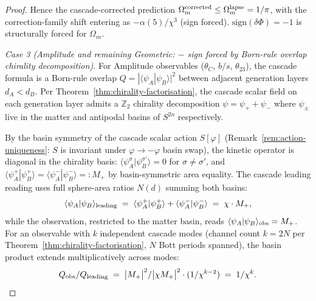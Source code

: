 \documentclass[12pt,a4paper]{article}
\begin{document}
\begin{proof}
Hence the cascade-corrected prediction
$\Omega_m^{\rm corrected}\leq \Omega_m^{\rm lapse}=1/\pi$, with the
correction-family shift entering as $-\alpha(5)/\chi^3$ (sign forced).
$\mathrm{sign}(\delta\Phi)=-1$ is structurally forced for $\Omega_m$.

\emph{Case 3 (Amplitude and remaining Geometric: $-$ sign forced by
Born-rule overlap chirality decomposition).}
For Amplitude observables ($\theta_C$, $b/s$, $\theta_{23}$), the
cascade formula is a Born-rule overlap
$Q = |\langle\psi_A | \psi_B\rangle|^2$ between adjacent generation
layers $d_A < d_B$. Per Theorem~\ref{thm:chirality-factorisation},
the cascade scalar field on each generation layer admits a $\mathbb{Z}_2$
chirality decomposition $\psi = \psi_+ + \psi_-$ where $\psi_\pm$
live in the matter and antipodal basins of $S^{2n}$ respectively.

By the basin symmetry of the cascade scalar action $S[\varphi]$
(Remark~\ref{rem:action-uniqueness}: $S$ is invariant under
$\varphi\to-\varphi$ basin swap), the kinetic operator is diagonal in
the chirality basis: $\langle\psi_A^\sigma | \psi_B^{\sigma'}\rangle = 0$
for $\sigma\neq\sigma'$, and $\langle\psi_A^+ | \psi_B^+\rangle =
\langle\psi_A^- | \psi_B^-\rangle =: M_+$ by basin-symmetric area
equality. The cascade leading reading uses full sphere-area
ratios $N(d)$ summing both basins:
\[
\langle\psi_A | \psi_B\rangle_{\rm leading}
\;=\;\langle\psi_A^+|\psi_B^+\rangle + \langle\psi_A^-|\psi_B^-\rangle
\;=\; \chi\cdot M_+,
\]
while the observation, restricted to the matter basin, reads
$\langle\psi_A|\psi_B\rangle_{\rm obs} = M_+$. For an observable with
$k$ independent cascade modes (channel count $k=2N$ per
Theorem~\ref{thm:chirality-factorisation}, $N$ Bott periods spanned),
the basin product extends multiplicatively across modes:
\begin{equation}\label{eq:chirality-filter-amplitude}
Q_{\rm obs}/Q_{\rm leading}
\;=\;\bigl|M_+\bigr|^2/\bigl|\chi M_+\bigr|^2 \cdot (1/\chi^{k-2})
\;=\;1/\chi^k.
\end{equation}


\end{proof}
\end{document}
